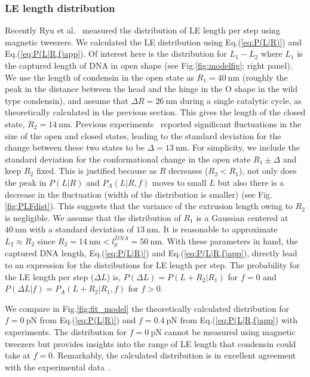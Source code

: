 \documentclass[fleqn,10pt]{wlscirep}
\newcommand{\pN}{\ \mathrm{pN}}
\newcommand{\nm}{\ \mathrm{nm}}
\newcommand{\vR}{R}
\newcommand{\vL}{L}
\begin{document}
\subsubsection*{LE length distribution}
Recently Ryu et al.~\cite{ryu2020resolving} measured the distribution of LE length per step using magnetic tweezers. We calculated the LE distribution using Eq.(\ref{eq:P(L|R)}) and Eq.(\ref{eq:P(L|R,f)app}).  Of interest here  is the distribution for $L_1-L_2$ where $L_1$ is the captured length of DNA in open shape (see Fig.\ref{fig:modelfig}; right panel). We use the length of condensin in the open state as $R_1=40\nm$ (roughly the peak in the distance between the head and the hinge in the O shape in the wild type condensin), and assume that  $\Delta R=26\nm$ during a single catalytic cycle, as theoretically calculated in the previous section. This gives the length of the closed state, $R_2=14\nm$. Previous experiments~\cite{ryu2020condensin} reported significant fluctuations in the size of the open and closed states, leading to the standard deviation for the change between these two states to be $\Delta=13\nm$. For simplicity, we include the standard deviation for the conformational change in the open state $R_1\pm \Delta$ and keep $R_2$ fixed. This is justified because as $R$ decreases ($R_2 < R_1$), not only does the peak in 
 $P(\vL|\vR)$ and $P_A(\vL|\vR,f)$ moves to small $\vL$ but also there is a decrease in the fluctuation (width of the distribution is smaller) (see Fig.\ref{fig:PLFdist}). This suggests that the variance of the extrusion length owing to $R_2$ is negligible. We assume that the distribution of $R_1$ is a Gaussian centered at $40\nm$ with a standard deviation of $13\nm$. It is reasonable to approximate $L_2 \approx R_2$ since $R_2=14\nm < l^{DNA}_p=50\nm$. With these  parameters in hand, the captured DNA length, Eq.(\ref{eq:P(L|R)}) and Eq.(\ref{eq:P(L|R,f)app}), directly lead to an expression for the distributions for LE length per step. The probability for the LE length per step ($\Delta \vL$) is, $P(\Delta \vL) =  P(\vL+R_2|R_1)$ for $f=0$ and $ P(\Delta \vL | f) = P_{A}(\vL+R_2|R_1,f)$ for $f>0$. %

We compare in Fig.\ref{fig:fit_model} the theoretically calculated distribution for $f=0\pN$ from Eq.(\ref{eq:P(L|R)}) and $f=0.4\pN$ from Eq.(\ref{eq:P(L|R,f)app}) with experiments. The distribution for $f=0 \pN$ cannot be measured using magnetic tweezers but provides insights into the range of LE length that condensin could take at $f=0$.   Remarkably, the calculated distribution is in excellent agreement with the experimental data~\cite{ryu2020resolving}. 
\end{document}
